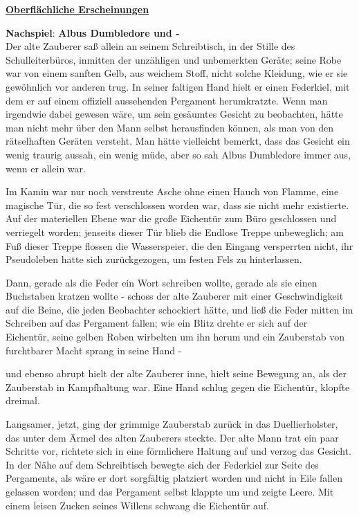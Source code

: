 

\hypertarget{oberfluxe4chliche-erscheinungen}{%

\textbf{\uline{Oberflächliche Erscheinungen}}

\textbf{Nachspiel}: \textbf{Albus Dumbledore und -}\\ Der alte Zauberer saß allein an seinem Schreibtisch, in der Stille des Schulleiterbüros, inmitten der unzähligen und unbemerkten Geräte; seine Robe war von einem sanften Gelb, aus weichem Stoff, nicht solche Kleidung, wie er sie gewöhnlich vor anderen trug. In seiner faltigen Hand hielt er einen Federkiel, mit dem er auf einem offiziell aussehenden Pergament herumkratzte. Wenn man irgendwie dabei gewesen wäre, um sein gesäumtes Gesicht zu beobachten, hätte man nicht mehr über den Mann selbst herausfinden können, als man von den rätselhaften Geräten versteht. Man hätte vielleicht bemerkt, dass das Gesicht ein wenig traurig aussah, ein wenig müde, aber so sah Albus Dumbledore immer aus, wenn er allein war.

Im Kamin war nur noch verstreute Asche ohne einen Hauch von Flamme, eine magische Tür, die so fest verschlossen worden war, dass sie nicht mehr existierte. Auf der materiellen Ebene war die große Eichentür zum Büro geschlossen und verriegelt worden; jenseits dieser Tür blieb die Endlose Treppe unbeweglich; am Fuß dieser Treppe flossen die Wasserspeier, die den Eingang versperrten nicht, ihr Pseudoleben hatte sich zurückgezogen, um festen Fels zu hinterlassen.

Dann, gerade als die Feder ein Wort schreiben wollte, gerade als sie einen Buchstaben kratzen wollte - schoss der alte Zauberer mit einer Geschwindigkeit auf die Beine, die jeden Beobachter schockiert hätte, und ließ die Feder mitten im Schreiben auf das Pergament fallen; wie ein Blitz drehte er sich auf der Eichentür, seine gelben Roben wirbelten um ihn herum und ein Zauberstab von furchtbarer Macht sprang in seine Hand -

und ebenso abrupt hielt der alte Zauberer inne, hielt seine Bewegung an, als der Zauberstab in Kampfhaltung war. Eine Hand schlug gegen die Eichentür, klopfte dreimal.

Langsamer, jetzt, ging der grimmige Zauberstab zurück in das Duellierholster, das unter dem Ärmel des alten Zauberers steckte. Der alte Mann trat ein paar Schritte vor, richtete sich in eine förmlichere Haltung auf und verzog das Gesicht. In der Nähe auf dem Schreibtisch bewegte sich der Federkiel zur Seite des Pergaments, als wäre er dort sorgfältig platziert worden und nicht in Eile fallen gelassen worden; und das Pergament selbst klappte um und zeigte Leere. Mit einem leisen Zucken seines Willens schwang die Eichentür auf.

}
